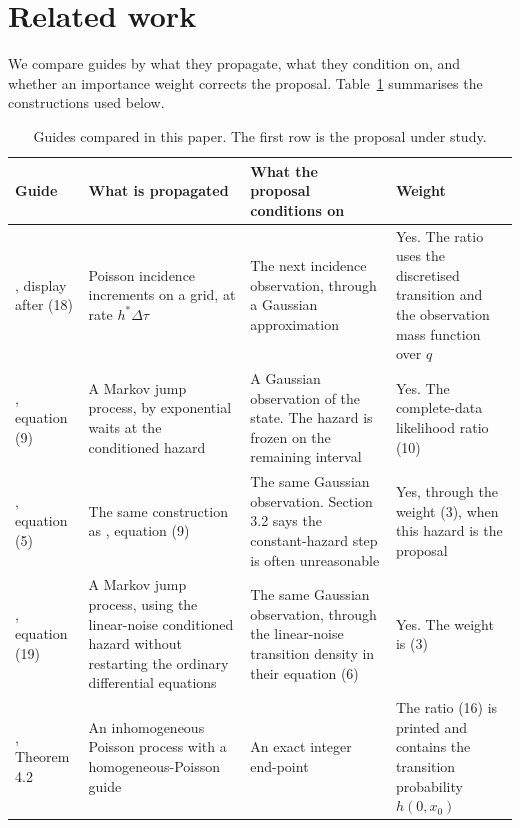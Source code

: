 \section{Related work}
\label{sec:related}

We compare guides by what they propagate, what they condition on, and whether an importance weight corrects the proposal. Table~\ref{tab:guides} summarises the constructions used below.

\begin{table}[t]
\centering
\caption{Guides compared in this paper. The first row is the proposal under study.}
\label{tab:guides}
{\small\setlength{\tabcolsep}{2pt}%
\begin{tabular}{p{}p{}p{}p{}}
\hline
Guide & What is propagated & What the proposal conditions on & Weight \\
\hline
\citet{whitaker2025}, display after (18) & Poisson incidence increments on a grid, at rate \(h^{*}\Delta\tau\) & The next incidence observation, through a Gaussian approximation & Yes. The ratio uses the discretised transition and the observation mass function over \(q\) \\
\citet{golightly2015}, equation (9) & A Markov jump process, by exponential waits at the conditioned hazard & A Gaussian observation of the state. The hazard is frozen on the remaining interval & Yes. The complete-data likelihood ratio (10) \\
\citet{golightly2019}, equation (5) & The same construction as \citet{golightly2015}, equation (9) & The same Gaussian observation. Section 3.2 says the constant-hazard step is often unreasonable & Yes, through the weight (3), when this hazard is the proposal \\
\citet{golightly2019}, equation (19) & A Markov jump process, using the linear-noise conditioned hazard without restarting the ordinary differential equations & The same Gaussian observation, through the linear-noise transition density in their equation (6) & Yes. The weight is (3) \\
\citet{corstanje2023}, Theorem 4.2 & An inhomogeneous Poisson process with a homogeneous-Poisson guide & An exact integer end-point & The ratio (16) is printed and contains the transition probability \(h(0,x_0)\) \\
\hline
\end{tabular}}
\end{table}

